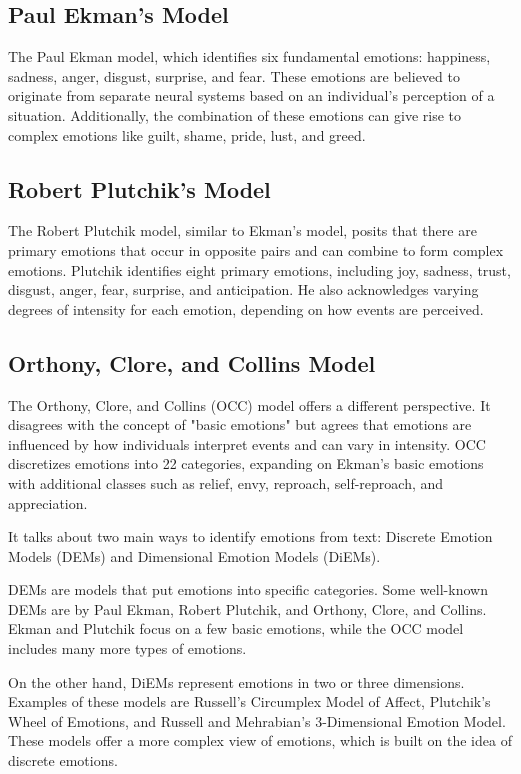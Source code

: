 \documentclass[12pt]{article}
\begin{document}
    \subsection*{Paul Ekman's Model}
    \par The Paul Ekman model, which identifies six fundamental emotions: happiness, sadness, anger, disgust, surprise, and fear. These emotions are believed to originate from separate neural systems based on an individual's perception of a situation. Additionally, the combination of these emotions can give rise to complex emotions like guilt, shame, pride, lust, and greed. \cite{ekman1999basic}
    \subsection*{Robert Plutchik's Model}
    \par The Robert Plutchik model, similar to Ekman's model, posits that there are primary emotions that occur in opposite pairs and can combine to form complex emotions. Plutchik identifies eight primary emotions, including joy, sadness, trust, disgust, anger, fear, surprise, and anticipation. He also acknowledges varying degrees of intensity for each emotion, depending on how events are perceived. \cite{plutchik1980general}
    \subsection*{Orthony, Clore, and Collins Model}
    \par The Orthony, Clore, and Collins (OCC) model offers a different perspective. It disagrees with the concept of "basic emotions" but agrees that emotions are influenced by how individuals interpret events and can vary in intensity. OCC discretizes emotions into 22 categories, expanding on Ekman's basic emotions with additional classes such as relief, envy, reproach, self-reproach, and appreciation.\cite{ortony2022cognitive}
    \\
    \par It talks about two main ways to identify emotions from text: Discrete Emotion Models (DEMs) and Dimensional Emotion Models (DiEMs).

    DEMs are models that put emotions into specific categories. Some well-known DEMs are by Paul Ekman, Robert Plutchik, and Orthony, Clore, and Collins. Ekman and Plutchik focus on a few basic emotions, while the OCC model includes many more types of emotions.

    On the other hand, DiEMs represent emotions in two or three dimensions. Examples of these models are Russell’s Circumplex Model of Affect, Plutchik’s Wheel of Emotions, and Russell and Mehrabian’s 3-Dimensional Emotion Model. These models offer a more complex view of emotions, which is built on the idea of discrete emotions. \cite{emotional_research}
\end{document}
